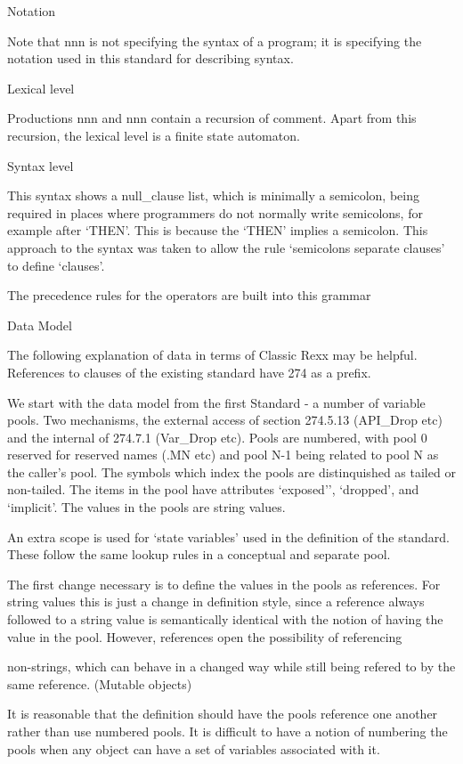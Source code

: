 Notation

Note that nnn is not specifying the syntax of a program; it is
specifying the notation used in this standard for describing syntax.

Lexical level

Productions nnn and nnn contain a recursion of comment. Apart from this
recursion, the lexical level is a finite state automaton.

Syntax level

This syntax shows a null\_clause list, which is minimally a semicolon,
being required in places where programmers do not normally write
semicolons, for example after `THEN'. This is because the `THEN' implies
a semicolon. This approach to the syntax was taken to allow the rule
`semicolons separate clauses' to define `clauses'.

The precedence rules for the operators are built into this grammar

Data Model

The following explanation of data in terms of Classic Rexx may be
helpful. References to clauses of the existing standard have 274 as a
prefix.

We start with the data model from the first Standard - a number of
variable pools. Two mechanisms, the external access of section 274.5.13
(API\_Drop etc) and the internal of 274.7.1 (Var\_Drop etc). Pools are
numbered, with pool 0 reserved for reserved names (.MN etc) and pool N-1
being related to pool N as the caller's pool. The symbols which index
the pools are distinquished as tailed or non-tailed. The items in the
pool have attributes `exposed'', `dropped', and `implicit'. The values
in the pools are string values.

An extra scope is used for `state variables' used in the definition of
the standard. These follow the same lookup rules in a conceptual and
separate pool.

The first change necessary is to define the values in the pools as
references. For string values this is just a change in definition style,
since a reference always followed to a string value is semantically
identical with the notion of having the value in the pool. However,
references open the possibility of referencing

non-strings, which can behave in a changed way while still being refered
to by the same reference. (Mutable objects)

It is reasonable that the definition should have the pools reference one
another rather than use numbered pools. It is difficult to have a notion
of numbering the pools when any object can have a set of variables
associated with it.

